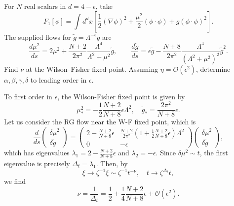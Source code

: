 For $N$ real scalars in $d=4-\epsilon$, take
\begin{equation}
    F_1[\phi]=\int d^dx\left[
    \frac12(\nabla\phi)^2
    +\frac{\mu^2}{2}(\phi\cdot\phi)
    +g(\phi\cdot\phi)^2\right].
\end{equation}
The supplied flows for $\tilde g=\Lambda^{-\epsilon}g$ are
\begin{equation}
    \frac{d\mu^2}{ds}=2\mu^2+
    \frac{N+2}{2\pi^2}\frac{\Lambda^4}{\Lambda^2+\mu^2}\tilde g,
    \qquad
    \frac{d\tilde g}{ds}=\epsilon\tilde g-
    \frac{N+8}{2\pi^2}
    \frac{\Lambda^4}{(\Lambda^2+\mu^2)^2}\tilde g^{2}.
\end{equation}
Find $\nu$ at the Wilson--Fisher fixed point. Assuming
$\eta=O(\epsilon^2)$, determine $\alpha,\beta,\gamma,\delta$ to
leading order in $\epsilon$.
\begin{solution}
    To first order in $\epsilon$, the Wilson-Fisher fixed point is given by
    \begin{equation}
        \mu_*^2 = -\frac12\frac{N+2}{N+8}\epsilon \Lambda^2, \quad \tilde g_* = \frac{2\pi^2}{N+8}\epsilon.
    \end{equation}
    Let us consider the RG flow near the W-F fixed point, which is
    \begin{equation}
        \frac{d}{ds}\begin{pmatrix}
            \delta\mu^2 \\ \delta \tilde g
        \end{pmatrix} = \begin{pmatrix}
            2-\frac{N+2}{N+8}\epsilon & \frac{N+2}{2\pi^2}\left(1+\frac{1}{2}\frac{N+2}{N+8}\epsilon\right)\Lambda^2\\
            0 & -\epsilon
        \end{pmatrix}\begin{pmatrix}
            \delta \mu^2 \\ \delta \tilde g
        \end{pmatrix},
    \end{equation}
    which has eigenvalues $\lambda_1 = 2-\frac{N+2}{N+8}\epsilon$ and $\lambda_2 = -\epsilon$. Since $\delta\mu^2 \sim t$, the first eigenvalue is precisely $\Delta_t  =\lambda_1$. Then, by
    \begin{equation}
        \xi \to \zeta^{-1}\xi \sim\zeta^{-1}t^{-\nu}, \quad t \to \zeta^{\Delta_t}t,
    \end{equation}
    we find
    \begin{equation}
        \nu = \frac{1}{\Delta_t} = \frac{1}{2} + \frac{1}{4}\frac{N+2}{N+8}\epsilon + \mathcal{O}(\epsilon^2).

\end{equation}
\end{solution}
